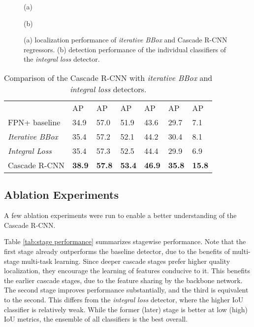 \documentclass[10pt,journal,compsoc]{IEEEtran}
\newcommand{\bd}[1]{\textbf{#1}}
\newcommand{\tablestyle}[2]{\setlength{\tabcolsep}{#1}\renewcommand{\arraystretch}{#2}\centering\footnotesize}
\begin{document}
\begin{figure}[!t]
\begin{minipage}[b]{.48\linewidth}
\centering
\centerline{}{(a)}
\end{minipage}
\hfill
\begin{minipage}[b]{.48\linewidth}
\centering
\centerline{}{(b)}
\end{minipage}
\caption{(a) localization performance of \textit{iterative BBox} and Cascade
R-CNN regressors. (b) detection performance of the individual
classifiers of the \textit{integral loss} detector.}
\label{fig:localization and integral}\vspace{-2mm}
\end{figure}

\begin{table}[t]
\tablestyle{1.8pt}{1.2}
\begin{tabular}{l|x{22}|x{22}x{22}x{22}x{22}x{22}}
& AP & AP & AP &AP &AP &AP\\ [.1em]
\shline
FPN+ baseline &34.9 &57.0  &51.9 &43.6 &29.7  &7.1\\
\textit{Iterative BBox} &35.4 &57.2  &52.1 &44.2 &30.4  &8.1\\
\textit{Integral Loss} &35.4 &57.3  &52.5 &44.4 &29.9  &6.9\\\hline
Cascade R-CNN &\bd{38.9} &\bd{57.8}  &\bd{53.4} &\bd{46.9} &\bd{35.8}  &\bd{15.8}\\
\end{tabular}\vspace{2mm}
\caption{Comparison of the Cascade R-CNN with \textit{iterative BBox} and
\textit{integral loss} detectors.}
\label{tab:comparison}\vspace{-3mm}
\end{table}

\subsection{Ablation Experiments}

A few ablation experiments were run to enable a better understanding of the
Cascade R-CNN.

\vspace{0.2cm}
Table \ref{tab:stage performance} summarizes stagewise performance.
Note that the first stage already outperforms the baseline detector,
due to the benefits of multi-stage multi-task learning. Since deeper cascade
stages prefer higher quality localization, they encourage the learning of
features conducive to it. This benefits the earlier cascade stages, due to
the feature sharing by the backbone network. The second stage improves
performance substantially, and the third is equivalent to the second.
This differs from the \textit{integral loss} detector, where the higher
IoU classifier is relatively weak. While the former (later) stage is better at low (high) IoU metrics, the ensemble of all classifiers is the best overall.
\end{document}
